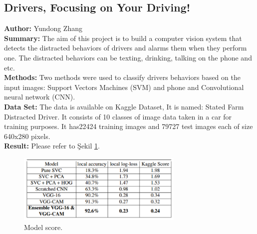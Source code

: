 \documentclass[12pt,a4paper]{article}
\begin{document}
    \subsection{Drivers, Focusing on Your Driving!}
    \textbf{Author:} Yundong Zhang \cite{drvr}\\
    \textbf{Summary:} The aim of this project is to build a computer vision system that detects the distracted behaviors of
drivers and alarms them when they perform one. The distracted behaviors can be texting, drinking,
talking on the phone and etc. \\
    \textbf{Methods:} Two methods were used to classify drivers behaviors based on the input images: Support Vectors
Machines (SVM) and phone and Convolutional neural network (CNN). \\
	\textbf{Data Set:} The data is available on Kaggle Dataset, It is named: Stated Farm Distracted Driver. It consists of 10
classes of image data taken in a car for training purposes. It has22424 training images and 79727 test
images each of size 640x280 pixels. \\
    \textbf{Result:} Please refer to Şekil \ref{fig:vgg}.

    \begin{figure}
        \begin{center}
            \includegraphics[width=300px]{resimler/vgg.png}
            \caption{Model score.}
            \label{fig:vgg}
        \end{center}
    \end{figure}
\end{document}
